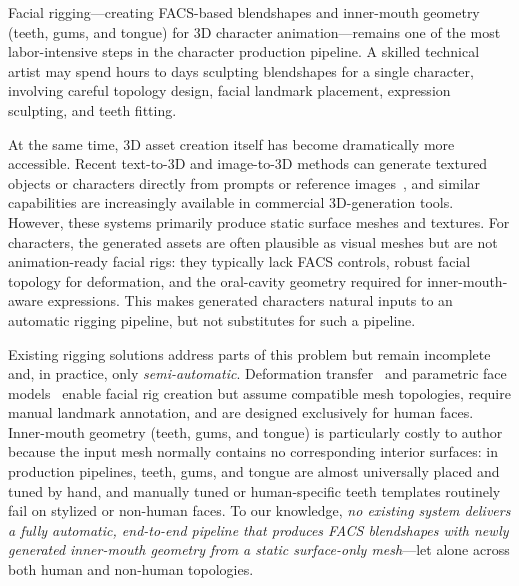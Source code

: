 \documentclass[acmtog,anonymous,review]{acmart}
\begin{document}
Facial rigging---creating FACS-based blendshapes and inner-mouth geometry (teeth, gums, and tongue) for 3D character animation---remains one of the most labor-intensive steps in the character production pipeline. A skilled technical artist may spend hours to days sculpting blendshapes for a single character, involving careful topology design, facial landmark placement, expression sculpting, and teeth fitting.

At the same time, 3D asset creation itself has become dramatically more accessible. Recent text-to-3D and image-to-3D methods can generate textured objects or characters directly from prompts or reference images~\cite{poole2023dreamfusion, lin2023magic3d, jun2023shape, liu2023zero123, tang2024make, ren2023make}, and similar capabilities are increasingly available in commercial 3D-generation tools. However, these systems primarily produce static surface meshes and textures. For characters, the generated assets are often plausible as visual meshes but are not animation-ready facial rigs: they typically lack FACS controls, robust facial topology for deformation, and the oral-cavity geometry required for inner-mouth-aware expressions. This makes generated characters natural inputs to an automatic rigging pipeline, but not substitutes for such a pipeline.

Existing rigging solutions address parts of this problem but remain incomplete and, in practice, only \emph{semi-automatic}. Deformation transfer~\cite{sumner2004deformation} and parametric face models~\cite{cao2014facewarehouse, li2017learning} enable facial rig creation but assume compatible mesh topologies, require manual landmark annotation, and are designed exclusively for human faces. Inner-mouth geometry (teeth, gums, and tongue) is particularly costly to author because the input mesh normally contains no corresponding interior surfaces: in production pipelines, teeth, gums, and tongue are almost universally placed and tuned by hand, and manually tuned or human-specific teeth templates routinely fail on stylized or non-human faces. To our knowledge, \emph{no existing system delivers a fully automatic, end-to-end pipeline that produces FACS blendshapes with newly generated inner-mouth geometry from a static surface-only mesh}---let alone across both human and non-human topologies.
\end{document}

